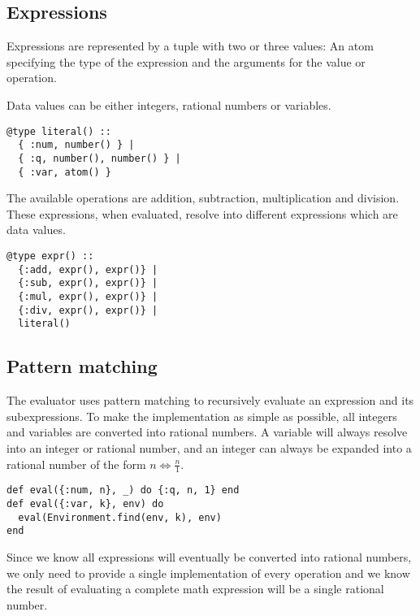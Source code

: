 \documentclass[a4paper,11pt]{article}
\begin{document}
\subsection*{Expressions}

Expressions are represented by a tuple with two or three values: An atom specifying the type of the expression and the arguments for the value or operation.

Data values can be either integers, rational numbers or variables.

\begin{verbatim}
@type literal() ::
  { :num, number() } |
  { :q, number(), number() } |
  { :var, atom() }
\end{verbatim}

The available operations are addition, subtraction, multiplication and division. These expressions, when evaluated, resolve into different expressions which are data values.

\begin{verbatim}
@type expr() ::
  {:add, expr(), expr()} |
  {:sub, expr(), expr()} |
  {:mul, expr(), expr()} |
  {:div, expr(), expr()} |
  literal()
\end{verbatim}

\subsection*{Pattern matching}

The evaluator uses pattern matching to recursively evaluate an expression and its subexpressions.
To make the implementation as simple as possible, all integers and variables are converted into rational numbers.
A variable will always resolve into an integer or rational number, and an integer can always be expanded into a rational number of the form $n \Longleftrightarrow \frac{n}{1}$.

\begin{verbatim}
def eval({:num, n}, _) do {:q, n, 1} end
def eval({:var, k}, env) do
  eval(Environment.find(env, k), env)
end
\end{verbatim}

Since we know all expressions will eventually be converted into rational numbers, we only need to provide a single implementation of every operation and we know the result of evaluating a complete math expression will be a single rational number.
\end{document}
